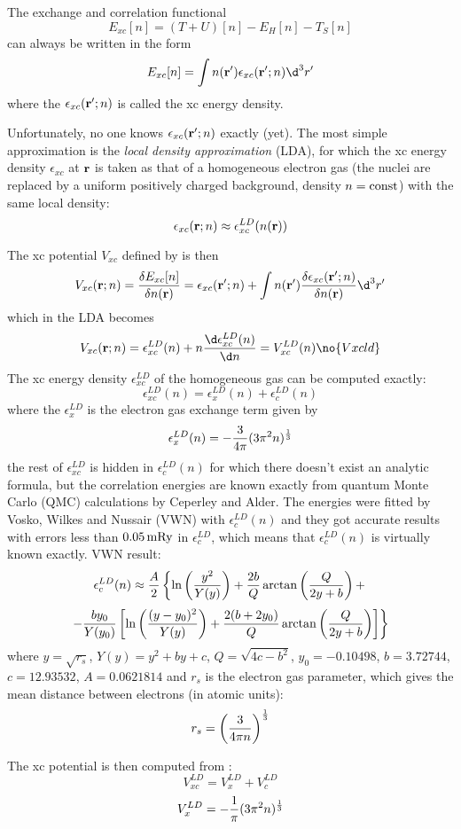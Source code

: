 The exchange and correlation functional
$$E_{xc}[n]=(T+U)[n]-E_H[n]-T_S[n]$$
can always be written in the form
$$E_{xc}[n]=\int n({\bf r}')\epsilon_{xc}({\bf r}';n)\d^3r'$$
where the $\epsilon_{xc}({\bf r}';n)$ is called the xc energy density. 

Unfortunately, no one knows $\epsilon_{xc}({\bf r}';n)$ exactly (yet).  The
most simple approximation is the {\it local density approximation \/} (LDA),
for which the xc energy density $\epsilon_{xc}$ at $\bf r$ is taken as that of
a homogeneous electron gas (the nuclei are replaced by a uniform positively
charged background, density $n=\rm const$) with the same local density:
$$\epsilon_{xc}({\bf r};n)\approx\epsilon_{xc}^{LD}(n({\bf r}))$$

The xc potential $V_{xc}$ defined by  is then
$$V_{xc}({\bf r};n)={\delta E_{xc}[n]\over\delta n({\bf r})}=
\epsilon_{xc}({\bf r}';n)+
\int n({\bf r}'){\delta \epsilon_{xc}({\bf r}';n)\over\delta n({\bf r})}\d^3r'
$$
which in the LDA becomes
$$V_{xc}({\bf r};n)
=\epsilon_{xc}^{LD}(n)+n{\d \epsilon_{xc}^{LD}(n)\over \d n}=V_{xc}^{LD}(n)
\no{Vxcld}$$
The xc energy density $\epsilon_{xc}^{LD}$ of the homogeneous gas can be
computed exactly\cite{martin}: 
$$\epsilon_{xc}^{LD}(n)=\epsilon_x^{LD}(n)+\epsilon_c^{LD}(n)$$
where the $\epsilon_x^{LD}$ is the electron gas exchange term given
by\cite{martin}
$$\epsilon_x^{LD}(n)=-{3\over4\pi}(3\pi^2 n)^{1\over3}$$
the rest of $\epsilon_{xc}^{LD}$ is hidden in $\epsilon_c^{LD}(n)$ for which
there doesn't exist an analytic formula, but the correlation energies are known
exactly from quantum Monte Carlo (QMC) calculations by Ceperley and
Alder\cite{pickett}. The energies were fitted by
Vosko, Wilkes and Nussair (VWN) with
$\epsilon_c^{LD}(n)$ and they got accurate results with errors less than
$0.05\rm\,mRy$ in $\epsilon_c^{LD}$, which means that $\epsilon_c^{LD}(n)$ is
virtually known exactly. VWN result:
$$\epsilon_c^{LD}(n)\approx {A\over2}\left\{
\ln\left(y^2\over Y(y)\right)+{2b\over Q}\arctan\left(Q\over 2y+b\right)+
\right.
$$
$$\left.
-{by_0\over Y(y_0)}\left[\ln\left((y-y_0)^2\over Y(y)\right)
+{2(b+2y_0)\over Q}\arctan\left(Q\over 2y+b\right)
\right] \right\}$$
where $y=\sqrt{r_s}$, $Y(y)=y^2+by+c$, $Q=\sqrt{4c-b^2}$, $y_0=-0.10498$,
$b=3.72744$, $c=12.93532$, $A=0.0621814$ and $r_s$ is the electron gas
parameter, which gives the mean distance between electrons (in atomic units):
$$r_s=\left(3\over4\pi n\right)^{1\over3}$$

The xc potential is then computed from :
$$V_{xc}^{LD}=V_x^{LD}+V_c^{LD}$$
$$V_x^{LD}=-{1\over\pi}(3\pi^2 n)^{1\over3}$$

